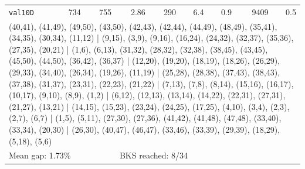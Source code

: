 \begin{longtable}{lrrrrrrrr}
\texttt{val10D} & 734 & 755 & 2.86 & 290 & 6.4 & 0.9 & 9409 & 0.5 \\
\multicolumn{9}{p{0.96\linewidth}}{\tiny\raggedright\arraybackslash (40,41), (41,49), (49,50), (43,50), (42,43), (42,44), (44,49), (48,49), (35,41), (34,35), (30,34), (11,12) | (9,15), (3,9), (9,16), (16,24), (24,32), (32,37), (35,36), (27,35), (20,21) | (1,6), (6,13), (31,32), (28,32), (32,38), (38,45), (43,45), (45,50), (44,50), (36,42), (36,37) | (12,20), (19,20), (18,19), (18,26), (26,29), (29,33), (34,40), (26,34), (19,26), (11,19) | (25,28), (28,38), (37,43), (38,43), (37,38), (31,37), (23,31), (22,23), (21,22) | (7,13), (7,8), (8,14), (15,16), (16,17), (10,17), (9,10), (8,9), (1,2) | (6,12), (12,13), (13,14), (14,22), (22,31), (27,31), (21,27), (13,21) | (14,15), (15,23), (23,24), (24,25), (17,25), (4,10), (3,4), (2,3), (2,7), (6,7) | (1,5), (5,11), (27,30), (27,36), (41,42), (41,48), (47,48), (33,40), (33,34), (20,30) | (26,30), (40,47), (46,47), (33,46), (33,39), (29,39), (18,29), (5,18), (5,6)} \\[2pt]
\midrule
\multicolumn{3}{l}{Mean gap: 1.73\%} & \multicolumn{6}{l}{BKS reached: 8/34} \\
\end{longtable}
\endgroup